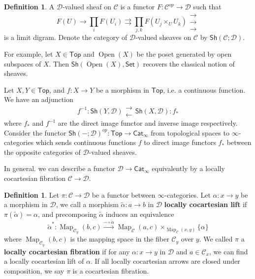 \documentclass[11pt]{amsart}
\numberwithin{equation}{section}
\theoremstyle{definition}
\newtheorem{defn}[thm]{Definition}
\theoremstyle{remark}
\numberwithin{equation}{section}
\newcommand{\sh}{\mathsf{Sh}}
\newcommand{\set}{\mathsf{Set}}
\newcommand{\cat}{\mathsf{Cat}}
\newcommand{\Top}{\mathsf{Top}}
\newcommand{\map}{\operatorname{Map}}
\newcommand{\open}{\operatorname{Open}}
\begin{document}
\begin{defn}
	A $\mathscr{D}$-valued sheaf on $\mathscr{C}$ is a functor $F: \mathscr{C}^{op}\to \mathscr{D}$ such that 
	\begin{equation*}
	F(U) \to \prod_i F(U_i) \rightrightarrows \prod_{j,k} F(U_j\times_{U}U_k)\substack{\rightarrow\\[-1em] \rightarrow \\[-1em] \rightarrow}
	\end{equation*}
	is a limit digram. Denote the category of $\mathscr{D}$-valued sheaves on $\mathscr{C}$ by $\sh(\mathscr{C};\mathscr{D})$.
\end{defn}
For example, let $X\in \Top$ and $\open(X)$ be the poset generated by open subspaces of $X$. Then $\sh(\open(X),\set)$ recovers the classical notion of sheaves.

Let $X, Y\in \Top$,  and $f: X\to Y$ be a morphism in $\Top$, i.e. a continuous function. We have an adjunction
\begin{equation*}
f^{-1}: \sh(Y,\mathscr{D}) \substack{\longrightarrow\\[-1em]  \longleftarrow}\sh(X,\mathscr{D}): f_*
\end{equation*}
where $f_*$ and $f^{-1}$ are the direct image functor and inverse image respectively. Consider the functor $\sh(-;\mathscr{D})^{op}: \Top\to \cat_{\infty}$ from topological spaces to $\infty$-categories which sends continuous functions $f$ to direct image functors $f_{*}$ between the opposite categories of $\mathscr{D}$-valued sheaves.

In general. we can describe a functor $\mathscr{D} \to \cat_{\infty}$ equivalently by a locally cocartesian fibration $\mathscr{C}\to \mathscr{D}$. 
\begin{defn}
	Let $\pi: \mathscr{C}\to \mathscr{D}$ be a functor between $\infty$-categories. Let $\alpha: x \to y$ be a morphism in $\mathscr{D}$, we call a morphism $\tilde{\alpha}: a\to b$ in $\mathscr{D}$ {\bf locally cocartesian lift} if $\pi(\tilde{\alpha})= \alpha$, and precomposing  $\tilde{\alpha}$ induces an equivalence
	\begin{equation*}
	\tilde{\alpha}^*: \map_{\mathscr{C}_y}(b,c) \stackrel{-\circ \tilde{\alpha}}{\longrightarrow} \map_{\mathscr{C}}(a,c) \times_{\map_{\mathscr{C}}(x,y)} \{\alpha \}
	\end{equation*}
	where $\map_{\mathscr{C}_y}(b,c)$ is the mapping space in the fiber $\mathscr{C}_y$ over $y$. We called $\pi$ a {\bf locally cocartesian fibration} if for any $\alpha: x\to y$ in $\mathscr{D}$ and $a\in \mathscr{C}_x$, we can find a locally cocartesian lift of $\alpha$. If all locally cocartesian arrows are closed under composition, we say $\pi$ is a cocartesian fibration.
\end{defn}
\end{document}
